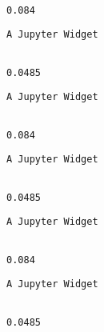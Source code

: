 \documentclass[11pt]{article}
\begin{document}
    
    \begin{Verbatim}[commandchars=\\\{\}]

0.084

    \end{Verbatim}

    
    \begin{verbatim}
A Jupyter Widget
    \end{verbatim}

    
    \begin{Verbatim}[commandchars=\\\{\}]

0.0485

    \end{Verbatim}

    
    \begin{verbatim}
A Jupyter Widget
    \end{verbatim}

    
    \begin{Verbatim}[commandchars=\\\{\}]

0.084

    \end{Verbatim}

    
    \begin{verbatim}
A Jupyter Widget
    \end{verbatim}

    
    \begin{Verbatim}[commandchars=\\\{\}]

0.0485

    \end{Verbatim}

    
    \begin{verbatim}
A Jupyter Widget
    \end{verbatim}

    
    \begin{Verbatim}[commandchars=\\\{\}]

0.084

    \end{Verbatim}

    
    \begin{verbatim}
A Jupyter Widget
    \end{verbatim}

    
    \begin{Verbatim}[commandchars=\\\{\}]

0.0485

    \end{Verbatim}
\end{document}
